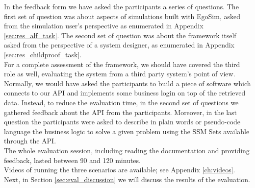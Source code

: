 In the feedback form we have asked the participants a series of questions. The first set of question was about aspects of simulations built with EgoSim, asked from the simulation user's perspective as enumerated in Appendix \ref{sec:res_alf_task}. The second set of question was about the framework itself asked from the perspective of a system designer, as enumerated in Appendix \ref{sec:res_childproof_task}.\\

For a complete assessment of the framework, we should have covered the third role as well, evaluating the system from a third party system's point of view. Normally, we would have asked the participants to build a piece of software which connects to our API and implements some business login on top of the retrieved data. Instead, to reduce the evaluation time, in the second set of questions we gathered feedback about the API from the participants. Moreover, in the last question the participants were asked to describe in plain words or pseudo-code language the business logic to solve a given problem using the SSM Sets available through the API.\\

The whole evaluation session, including reading the documentation and providing feedback, lasted between 90 and 120 minutes.\\

Videos of running the three scenarios are available; see Appendix \ref{ch:videos}.\\

Next, in Section \ref{sec:eval_discussion} we will discuss the results of the evaluation.\\
